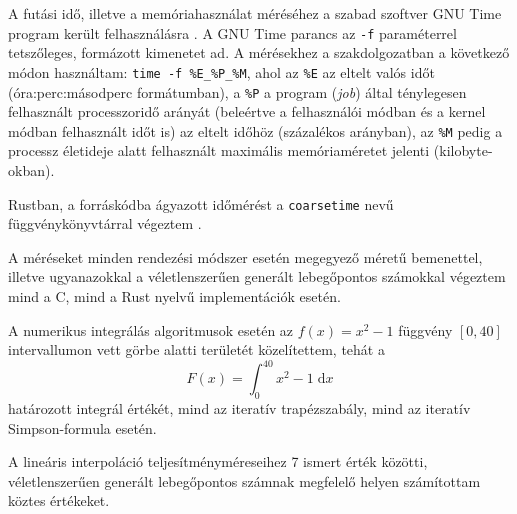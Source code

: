 

A futási idő, illetve a memóriahasználat méréséhez a szabad szoftver GNU Time program került felhasználásra \cite{gnutime}. A GNU Time parancs az \lstinline{-f} paraméterrel tetszőleges, formázott kimenetet ad. A mérésekhez a szakdolgozatban a következő módon használtam: \lstinline{time -f %E_%P_%M}, ahol az \lstinline{%E} az eltelt valós időt (óra:perc:másodperc formátumban), a \lstinline{%P} a program (\textit{job}) által ténylegesen felhasznált processzoridő arányát (beleértve a felhasználói módban és a kernel módban felhasznált időt is) az eltelt időhöz (százalékos arányban), az \lstinline{%M} pedig a processz életideje alatt felhasznált maximális memóriaméretet jelenti (kilobyte-okban).

Rustban, a forráskódba ágyazott időmérést a \texttt{coarsetime} nevű függvénykönyvtárral végeztem \cite{coarsetime}.

A méréseket minden rendezési módszer esetén megegyező méretű bemenettel, illetve ugyanazokkal a véletlenszerűen generált lebegőpontos számokkal végeztem mind a C, mind a Rust nyelvű implementációk esetén.

A numerikus integrálás algoritmusok esetén az \(f(x) = x^2 - 1\) függvény \(\left[0, 40\right]\) intervallumon vett görbe alatti területét közelítettem, tehát a
\[ F(x) = \int_0^{40} \! x^2 - 1 \; \mathrm{d}x\]
határozott integrál értékét, mind az iteratív trapézszabály, mind az iteratív Simpson-formula esetén.

A lineáris interpoláció teljesítményméreseihez 7 ismert érték közötti, véletlenszerűen generált lebegőpontos számnak megfelelő helyen számítottam köztes értékeket.


